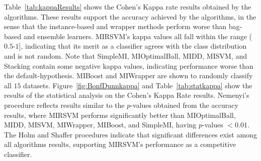 \documentclass[preprint,12pt]{elsarticle}
\begin{document}
\begin{table}[b!]
{}\vspace{-0.6em}
\label{fig:BonfDunnkappa}
\vspace{-0.5em}
\label{tab:statkappa}
\scriptsize
{}
\end{table}
Table~\ref{tab:kappaResults} shows the Cohen's Kappa rate results obtained by the algorithms. These results support the accuracy achieved by the algorithms, in the sense that the instance-based and wrapper methods perform worse than bag-based and ensemble learners. MIRSVM's kappa values all fall within the range ($0.5$-$1$], indicating that its merit as a classifier agrees with the class distribution and is not random. Note that SimpleMI, MIOptimalBall, MIDD, MISVM, and Stacking contain some negative kappa values, indicating performance worse than the default-hypothesis. MIBoost and MIWrapper are shown to randomly classify all $15$ datasets. Figure~\ref{fig:BonfDunnkappa} and Table~\ref{tab:statkappa} show the results of the statistical analysis on the Cohen's Kappa Rate results. Nemenyi's procedure reflects results similar to the $p$-values obtained from the accuracy results, where MIRSVM performs significantly better than MIOptimalBall, MIDD, MISVM, MIWrapper, MIBoost, and SimpleMI, having $p$-values $< 0.01$. The Holm and Shaffer procedures indicate that significant differences exist among all algorithms results, supporting MIRSVM's performance as a competitive classifier.
\end{document}
